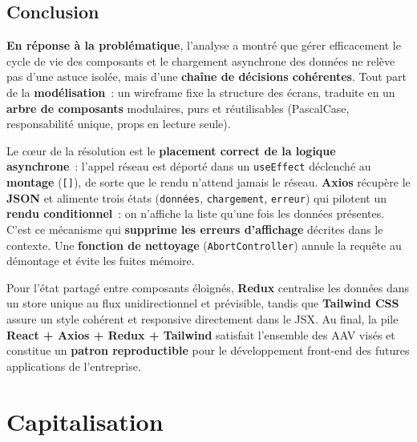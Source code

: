 \newpage

\subsection*{Conclusion}
{}

\noindent \textbf{En réponse à la problématique}, l'analyse a montré que gérer efficacement le cycle de vie des composants et le chargement asynchrone des données ne relève pas d'une astuce isolée, mais d'une \textbf{chaîne de décisions cohérentes}. Tout part de la \textbf{modélisation}~: un wireframe fixe la structure des écrans, traduite en un \textbf{arbre de composants} modulaires, purs et réutilisables (PascalCase, responsabilité unique, props en lecture seule).

\vspace{0.2cm}

\noindent Le c\oe ur de la résolution est le \textbf{placement correct de la logique asynchrone}~: l'appel réseau est déporté dans un \texttt{useEffect} déclenché au \textbf{montage} (\texttt{[]}), de sorte que le rendu n'attend jamais le réseau. \textbf{Axios} récupère le \textbf{JSON} et alimente trois états (\texttt{données}, \texttt{chargement}, \texttt{erreur}) qui pilotent un \textbf{rendu conditionnel}~: on n'affiche la liste qu'une fois les données présentes. C'est ce mécanisme qui \textbf{supprime les erreurs d'affichage} décrites dans le contexte. Une \textbf{fonction de nettoyage} (\texttt{AbortController}) annule la requête au démontage et évite les fuites mémoire.

\vspace{0.2cm}

\noindent Pour l'état partagé entre composants éloignés, \textbf{Redux} centralise les données dans un store unique au flux unidirectionnel et prévisible, tandis que \textbf{Tailwind CSS} assure un style cohérent et responsive directement dans le JSX. Au final, la pile \textbf{React + Axios + Redux + Tailwind} satisfait l'ensemble des AAV visés et constitue un \textbf{patron reproductible} pour le développement front-end des futures applications de l'entreprise.

\newpage

\section*{Capitalisation}

